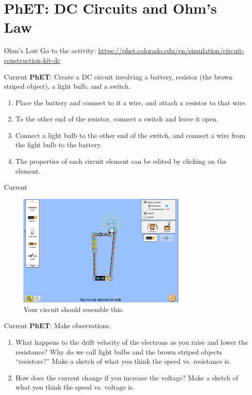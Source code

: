 \documentclass{beamer}
\begin{document}
\section{PhET: DC Circuits and Ohm's Law}

\begin{frame}{Ohm's Law}
Go to the activity: \url{https://phet.colorado.edu/en/simulation/circuit-construction-kit-dc}
\end{frame}

\begin{frame}{Current}
\textbf{\alert{PhET}}: Create a DC circuit involving a battery, resistor (the brown striped object), a light bulb, and a switch.
\begin{enumerate}
\item Place the battery and connect to it a wire, and attach a resistor to that wire.
\item To the other end of the resistor, connect a switch and leave it open.
\item Connect a light bulb to the other end of the switch, and connect a wire from the light bulb to the battery.
\item The properties of each circuit element can be edited by clicking on the element.
\end{enumerate}
\end{frame}

\begin{frame}{Current}
\begin{figure}
\centering
\includegraphics[width=0.75\textwidth]{figures/PhETBulb.png}
\caption{\label{fig:phetb} Your circuit should resemble this.}
\end{figure}
\end{frame}

\begin{frame}{Current}
\textbf{\alert{PhET}}: Make observations.
\begin{enumerate}
\item What happens to the drift velocity of the electrons as you raise and lower the resistance?  Why do we call light bulbs and the brown striped objects ``resistors?''  Make a sketch of what you think the speed vs. resistance is.
\item How does the current change if you increase the voltage? Make a sketch of what you think the speed vs. voltage is.
\end{enumerate}
\end{frame}
\end{document}
